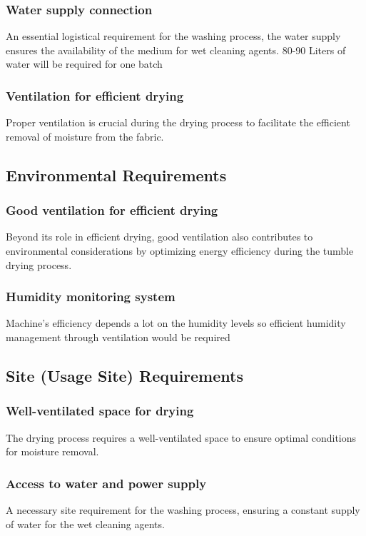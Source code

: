 \documentclass[12pt]{article} %
\begin{document}
  \subsubsection{Water supply connection} An essential logistical requirement for the washing process, the water supply ensures the availability of the medium for \gls{wet cleaning agent}s. 80-90 Liters of water will be required for one batch

  
  \subsubsection{Ventilation for efficient drying} Proper ventilation is crucial during the drying process to facilitate the efficient removal of moisture from the fabric. 

\clearpage

\subsection{Environmental Requirements}

 \subsubsection{Good ventilation for efficient drying} Beyond its role in efficient drying, good ventilation also contributes to environmental considerations by optimizing energy efficiency during the \gls{tumble drying process}.

 
 \subsubsection{Humidity monitoring system} Machine’s efficiency depends a lot on the humidity levels so efficient humidity management through ventilation would be required

\hspace{1cm}
\subsection{Site (Usage Site) Requirements}

 \subsubsection{Well-ventilated space for drying} The drying process requires a well-ventilated space to ensure optimal conditions for moisture removal.
 
 \subsubsection{Access to water and power supply} A necessary site requirement for the washing process, ensuring a constant supply of water for the \gls{wet cleaning agent}s.
 
\end{document}
